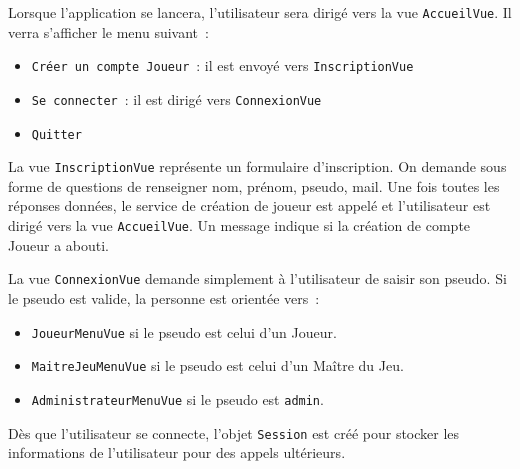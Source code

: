 \documentclass[11pt]{article}
\begin{document}
\bigbreak

Lorsque l'application se lancera, l'utilisateur sera dirigé vers la vue \texttt{AccueilVue}. Il verra s'afficher le menu suivant~:
\begin{itemize}[label=, font=\small]
    \item \texttt{Créer un compte Joueur}~: il est envoyé vers \texttt{InscriptionVue}
    \item \texttt{Se connecter}~: il est dirigé vers \texttt{ConnexionVue}
    \item \texttt{Quitter}
\end{itemize}

\bigbreak

La vue \texttt{InscriptionVue} représente un formulaire d'inscription. On demande sous forme de questions de renseigner nom, prénom, pseudo, mail. Une fois toutes les réponses données, le service de création de joueur est appelé et l'utilisateur est dirigé vers la vue \texttt{AccueilVue}. Un message indique si la création de compte Joueur a abouti. 

La vue \texttt{ConnexionVue} demande simplement à l'utilisateur de saisir son pseudo. Si le pseudo est valide, la personne est orientée vers~:
\begin{itemize}[label=, font=\small]
    \item \texttt{JoueurMenuVue} si le pseudo est celui d'un Joueur.
    \item \texttt{MaitreJeuMenuVue} si le pseudo est celui d'un Maître du Jeu.
    \item \texttt{AdministrateurMenuVue} si le pseudo est \texttt{admin}.
\end{itemize}

Dès que l'utilisateur se connecte, l'objet \texttt{Session} est créé pour stocker les informations de l'utilisateur pour des appels ultérieurs.
\bigbreak
\end{document}
